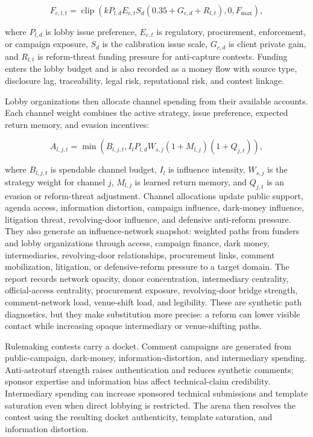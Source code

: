 \[
F_{c,l,t} =
\operatorname{clip}\left(k P_{l,d} E_{c,t} S_d (0.35 + G_{c,d} + R_{l,t}), 0, F_{\max}\right),
\]

where \(P_{l,d}\) is lobby issue preference, \(E_{c,t}\) is regulatory, procurement, enforcement, or campaign exposure, \(S_d\) is the calibration issue scale, \(G_{c,d}\) is client private gain, and \(R_{l,t}\) is reform-threat funding pressure for anti-capture contests. Funding enters the lobby budget and is also recorded as a money flow with source type, disclosure lag, traceability, legal risk, reputational risk, and contest linkage.

Lobby organizations then allocate channel spending from their available accounts. Each channel weight combines the active strategy, issue preference, expected return memory, and evasion incentives:

\[
A_{l,j,t} =
\min \left(B_{l,j,t}, I_l P_{l,d} W_{s,j}(1 + M_{l,j})(1 + Q_{j,t})\right),
\]

where \(B_{l,j,t}\) is spendable channel budget, \(I_l\) is influence intensity, \(W_{s,j}\) is the strategy weight for channel \(j\), \(M_{l,j}\) is learned return memory, and \(Q_{j,t}\) is an evasion or reform-threat adjustment. Channel allocations update public support, agenda access, information distortion, campaign influence, dark-money influence, litigation threat, revolving-door influence, and defensive anti-reform pressure. They also generate an influence-network snapshot: weighted paths from funders and lobby organizations through access, campaign finance, dark money, intermediaries, revolving-door relationships, procurement links, comment mobilization, litigation, or defensive-reform pressure to a target domain. The report records network opacity, donor concentration, intermediary centrality, official-access centrality, procurement exposure, revolving-door bridge strength, comment-network load, venue-shift load, and legibility. These are synthetic path diagnostics, but they make substitution more precise: a reform can lower visible contact while increasing opaque intermediary or venue-shifting paths.

Rulemaking contests carry a docket. Comment campaigns are generated from public-campaign, dark-money, information-distortion, and intermediary spending. Anti-astroturf strength raises authentication and reduces synthetic comments; sponsor expertise and information bias affect technical-claim credibility. Intermediary spending can increase sponsored technical submissions and template saturation even when direct lobbying is restricted. The arena then resolves the contest using the resulting docket authenticity, template saturation, and information distortion.

